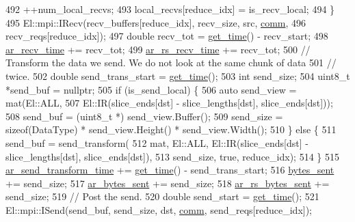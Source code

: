 \begin{DoxyCode}
492         ++num\_local\_recvs;
493         local\_recvs[reduce\_idx] = is\_recv\_local;
494       \}
495       El::mpi::IRecv(recv\_buffers[reduce\_idx], recv\_size, src, \hyperlink{file__io_8cpp_ab048c6f9fcbcfaa57ce68b00263dbebe}{comm},
496                      recv\_reqs[reduce\_idx]);
497       \textcolor{keywordtype}{double} recv\_tot = \hyperlink{namespacelbann_a478d36031ff0659893c4322cd856157f}{get\_time}() - recv\_start;
498       \hyperlink{classlbann_1_1lbann__comm_a4c9323938961c3524dc67f4b7b47e3ae}{ar\_recv\_time} += recv\_tot;
499       \hyperlink{classlbann_1_1lbann__comm_adefa0ee8b0a6b74072448e20d40f502d}{ar\_rs\_recv\_time} += recv\_tot;
500       \textcolor{comment}{// Transform the data we send. We do not look at the same chunk of data}
501       \textcolor{comment}{// twice.}
502       \textcolor{keywordtype}{double} send\_trans\_start = \hyperlink{namespacelbann_a478d36031ff0659893c4322cd856157f}{get\_time}();
503       \textcolor{keywordtype}{int} send\_size;
504       uint8\_t *send\_buf = \textcolor{keyword}{nullptr};
505       \textcolor{keywordflow}{if} (is\_send\_local) \{
506         \textcolor{keyword}{auto} send\_view = mat(El::ALL,
507                              El::IR(slice\_ends[dst] - slice\_lengths[dst], slice\_ends[dst]));
508         send\_buf = (uint8\_t *) send\_view.Buffer();
509         send\_size = \textcolor{keyword}{sizeof}(DataType) * send\_view.Height() * send\_view.Width();
510       \} \textcolor{keywordflow}{else} \{
511         send\_buf = send\_transform(
512                      mat, El::ALL, El::IR(slice\_ends[dst] - slice\_lengths[dst], slice\_ends[dst]),
513                      send\_size, \textcolor{keyword}{true}, reduce\_idx);
514       \}
515       \hyperlink{classlbann_1_1lbann__comm_a4e3d35520a8f567579f9235e9808ba1c}{ar\_send\_transform\_time} += \hyperlink{namespacelbann_a478d36031ff0659893c4322cd856157f}{get\_time}() - send\_trans\_start;
516       \hyperlink{classlbann_1_1lbann__comm_ad1f146ae7337ece6266fd307944928e0}{bytes\_sent} += send\_size;
517       \hyperlink{classlbann_1_1lbann__comm_aa520c16eafde742b70daf60866afc6a8}{ar\_bytes\_sent} += send\_size;
518       \hyperlink{classlbann_1_1lbann__comm_ac74bcfb565c1bb6604f336c6d1b647cc}{ar\_rs\_bytes\_sent} += send\_size;
519       \textcolor{comment}{// Post the send.}
520       \textcolor{keywordtype}{double} send\_start = \hyperlink{namespacelbann_a478d36031ff0659893c4322cd856157f}{get\_time}();
521       El::mpi::ISend(send\_buf, send\_size, dst, \hyperlink{file__io_8cpp_ab048c6f9fcbcfaa57ce68b00263dbebe}{comm}, send\_reqs[reduce\_idx]);

\end{DoxyCode}
